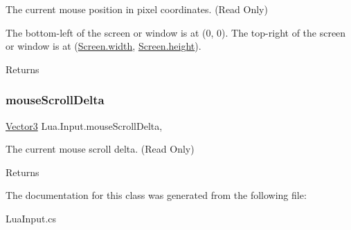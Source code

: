 The current mouse position in pixel coordinates. (Read Only) 

The bottom-\/left of the screen or window is at (0, 0). The top-\/right of the screen or window is at (\mbox{\hyperlink{class_lua_1_1_screen_ae44386bf8759e8f85e04358297f3dd95}{Screen.\+width}}, \mbox{\hyperlink{class_lua_1_1_screen_a7e3459d0ccc2641709d1bad599092fdc}{Screen.\+height}}). \begin{DoxyReturn}{Returns}

\end{DoxyReturn}
\mbox{\label{class_lua_1_1_input_ac508b474e85e336be67f2ad7ef94f751}} 
\subsubsection{\texorpdfstring{mouseScrollDelta}{mouseScrollDelta}}
{\footnotesize\ttfamily \mbox{\hyperlink{class_lua_1_1_vector3}{Vector3}} Lua.\+Input.\+mouse\+Scroll\+Delta\hspace{0.3cm}{\ttfamily [static]}, {\ttfamily [get]}}



The current mouse scroll delta. (Read Only) 

\begin{DoxyReturn}{Returns}

\end{DoxyReturn}


The documentation for this class was generated from the following file\+:\begin{DoxyCompactItemize}
\item 
Lua\+Input.\+cs\end{DoxyCompactItemize}
